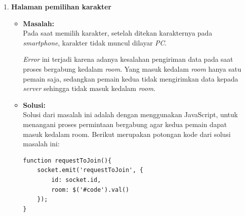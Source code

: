 \begin{enumerate}
	\item \textbf{Halaman pemilihan karakter}
	\begin{itemize}
		\item \textbf{Masalah:} \\
		Pada saat memilih karakter, setelah ditekan karakternya pada \textit{smartphone}, karakter tidak muncul dilayar \textit{PC}.
		
		\textit{Error} ini terjadi karena adanya kesalahan pengiriman data pada saat proses bergabung kedalam \textit{room}. Yang masuk kedalam \textit{room} hanya satu pemain saja, sedangkan pemain kedua tidak mengirimkan data kepada \textit{server} sehingga tidak masuk kedalam \textit{room}.
		
		\item \textbf{Solusi:} \\
		Solusi dari masalah ini adalah dengan menggunakan JavaScript, untuk menangani proses permintaan bergabung agar kedua pemain dapat masuk kedalam room. Berikut merupakan potongan kode dari solusi masalah ini:
		
\begin{lstlisting}[caption={Proses menangani memancarkan \textit{event}}, label={lst:submitEvent},captionpos=b]
function requestToJoin(){
	socket.emit('requestToJoin', {
		id: socket.id,
		room: $('#code').val()
	});
}
\end{lstlisting}
	\end{itemize}
\end{enumerate}

